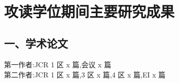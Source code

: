 {~}
\vspace{-9pt}
\section{攻读学位期间主要研究成果} %

\ifblindreview
\fi
\vspace{11pt}
\subsection*{一、学术论文}

\ifblindreview


\noindent
第一作者:JCR 1 区 x 篇,会议 x 篇 \\{}
第二作者:JCR 1 区 x 篇,3 区 x 篇,4 区 x 篇,EI x 篇 

